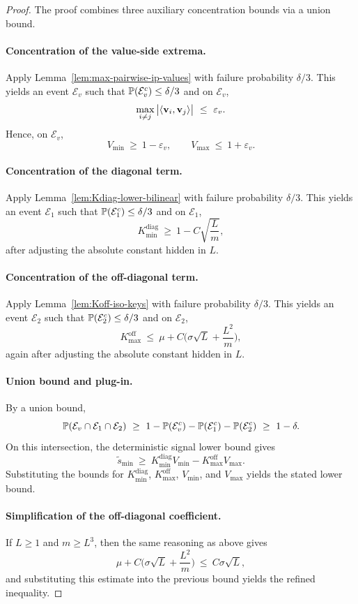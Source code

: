 \begin{proof}
The proof combines three auxiliary concentration bounds via a union bound.
\paragraph{Concentration of the value-side extrema.}
Apply Lemma~\ref{lem:max-pairwise-ip-values} with failure probability $\delta/3$.
This yields an event $\mathcal{E}_{v}$ such that $\mathbb{P}(\mathcal{E}_{v}^c)\le \delta/3$ and on $\mathcal{E}_{v}$,
\[
\max_{i\neq j}\big|\ip{\vv_i}{\vv_j}\big|\ \le\ \varepsilon_{v}.
\]
Hence, on $\mathcal{E}_{v}$,
\[
V_{\min}\ \ge\ 1-\varepsilon_{v},
\qquad
V_{\max}\ \le\ 1+\varepsilon_{v}.
\]

\paragraph{Concentration of the diagonal term.}
Apply Lemma~\ref{lem:Kdiag-lower-bilinear} with failure probability $\delta/3$.
This yields an event $\mathcal{E}_{1}$ such that $\mathbb{P}(\mathcal{E}_{1}^c)\le \delta/3$ and on $\mathcal{E}_{1}$,
\[
K_{\min}^{\mathrm{diag}}\ \ge\ 1-C\sqrt{\frac{L}{m}},
\]
after adjusting the absolute constant hidden in $L$.

\paragraph{Concentration of the off-diagonal term.}
Apply Lemma~\ref{lem:Koff-iso-keys} with failure probability $\delta/3$.
This yields an event $\mathcal{E}_{2}$ such that $\mathbb{P}(\mathcal{E}_{2}^c)\le \delta/3$ and on $\mathcal{E}_{2}$,
\[
K_{\max}^{\mathrm{off}}\ \le\ \mu+C\Big(\sigma\sqrt{L}+\frac{L^2}{m}\Big),
\]
again after adjusting the absolute constant hidden in $L$.

\paragraph{Union bound and plug-in.}
By a union bound,
\[
\Pbb(\mathcal{E}_{v}\cap\mathcal{E}_{1}\cap\mathcal{E}_{2})
\ \ge\ 1-\Pbb(\mathcal{E}_{v}^c)-\Pbb(\mathcal{E}_{1}^c)-\Pbb(\mathcal{E}_{2}^c)
\ \ge\ 1-\delta.
\]
On this intersection, the deterministic signal lower bound gives
\[
\widetilde{s}_{\min}\ \ge\ K_{\min}^{\mathrm{diag}}V_{\min}-K_{\max}^{\mathrm{off}}V_{\max}.
\]
Substituting the bounds for $K_{\min}^{\mathrm{diag}}$, $K_{\max}^{\mathrm{off}}$, $V_{\min}$, and $V_{\max}$ yields the stated lower bound.

\paragraph{Simplification of the off-diagonal coefficient.}
If \(L\ge 1\) and $m \geq L^3$, then the same reasoning as above gives
\[
\mu+C\Big(\sigma\sqrt{L}+\frac{L^2}{m}\Big)\ \le\ C\sigma\sqrt{L},
\]
and substituting this estimate into the previous bound yields the refined inequality.
\end{proof}

